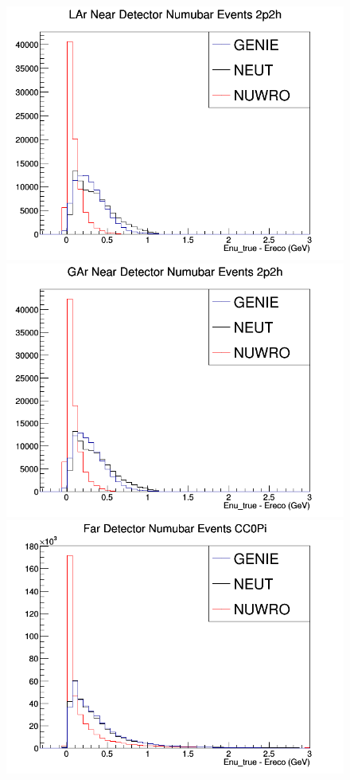 \documentclass[12pt]{article}
\begin{document}
\begin{figure}[h]
\endminipage
{}
\includegraphics[width=\linewidth]{Ereco_Etrue/numubar_LAr_2p2h.png}
\endminipage
{}
\includegraphics[width=\linewidth]{Ereco_Etrue/numubar_GAr_2p2h.png}
\endminipage
\newline
{}
\includegraphics[width=\linewidth]{Ereco_Etrue/numubar_FD_CC0Pi.png}

\end{figure}
\end{document}
